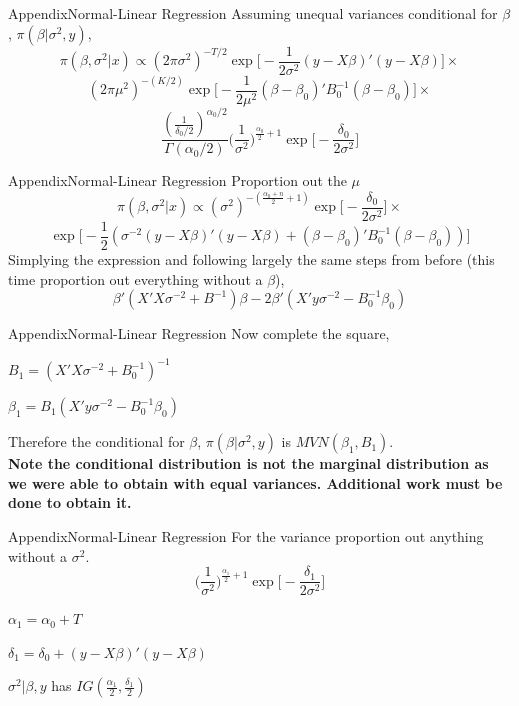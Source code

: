 \documentclass[table]{beamer}
\newcommand{\Bzero}{B_0^{-1}}
\begin{document}
\begin{frame}{Appendix}{Normal-Linear Regression}
	Assuming unequal variances conditional for $ \beta $, $ \pi(\beta|\sigma^{2}, y) $, 
	\[\pi(\beta, \sigma^2 | x) \propto  (2\pi\sigma^2)^{-T/2} \exp\Big[ -\frac{1}{2\sigma^2}(y-X\beta)'(y-X\beta) \Big] \times \]
	\[ (2\pi\mu^2)^{-(K/2)} \exp\Big[ -\frac{1}{2\mu^2}(\beta - \beta_0)'B_0^{-1}(\beta - \beta_0) \Big] \times  \]
	\[ \frac{(\frac{1}{\delta_0/2} )^{\alpha_0/2}}{\Gamma(\alpha_0/2)}  \Big(\frac{1}{\sigma^2}\Big)^{\frac{\alpha_0}{2} + 1} \exp\Big[ -\frac{\delta_0}{2\sigma^2} \Big] \]
\end{frame}

\begin{frame}{Appendix}{Normal-Linear Regression}
	Proportion out the $ \mu $
	\[	\pi(\beta, \sigma^2 | x) \propto (\sigma^2)^{-(\frac{\alpha_0 + n}{2} + 1)} \exp\Big[-\frac{\delta_0}{2\sigma^2}\Big] \times    \]
	\[ \exp\Big[ -\frac{1}{2}(\sigma^{-2}(y-X\beta)'(y-X\beta) + (\beta-\beta_0)'\Bzero(\beta - \beta_0))   \Big] \]
	Simplying the expression and following largely the same steps from before (this time proportion out everything without a $ \beta $),
	\[ \beta'(X'X\sigma^{-2} + B^{-1})\beta - 2\beta'(X'y\sigma^{-2} - B_0^{-1}\beta_0 )  \]
\end{frame}

\begin{frame}{Appendix}{Normal-Linear Regression}
	Now complete the square, 
	\begin{description}
		\item $ B_1 = (X'X\sigma^{-2}+B_0^{-1})^{-1} $
		\item $ \beta_1 = B_1(X'y\sigma^{-2} - B_0^{-1}\beta_0) $
	\end{description}
	Therefore the conditional for $ \beta $, $ \pi(\beta|\sigma^{2}, y) $ is $ MVN(\beta_1, B_1)  $. \\
	\textbf{Note the conditional distribution is not the marginal distribution as we were able to obtain with equal variances. Additional work must be done to obtain it.}
\end{frame}

\begin{frame}{Appendix}{Normal-Linear Regression}
	For the variance proportion out anything without a $ \sigma^2 $. 
	\[ \Big(\frac{1}{\sigma^2}\Big)^{\frac{\alpha_1}{2} + 1} \exp\Big[ -\frac{\delta_1}{2\sigma^2} \Big] \]
	\begin{description}
		\item $ \alpha_1 = \alpha_0 + T$
		\item $ \delta_1 = \delta_0 + (y-X\beta)'(y-X\beta) $
	\end{description}
	$ \sigma^2|\beta, y $ has $ IG(\frac{\alpha_1}{2}, \frac{\delta_1}{2}) $
\end{frame}
\end{document}
